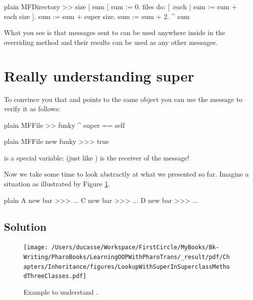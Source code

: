 \documentclass[10pt,twoside,english]{_support/latex/sbabook/sbabook}
\begin{document}
\begin{displaycode}{plain}
MFDirectory >> size
	| sum |
	sum := 0.
	files do: [ :each | sum := sum + each size ].
	sum := sum + super size.
	sum := sum + 2.
	^ sum
\end{displaycode}

What you see is that messages sent to  can be used anywhere inside in the overriding method and their results can be used as any other messages.
\section{Really understanding super}
To convince you that  and  points to the same object you can use the message \textcode{==} to verify it as follows: 

\begin{displaycode}{plain}
MFFile >> funky
	^ super == self
\end{displaycode}

\begin{displaycode}{plain}
MFFile new funky
>>> true
\end{displaycode}

\begin{important}
 is a special variable:  (just like ) is the receiver of the message! 
\end{important}

Now we take some time to look abstractly at what we presented so far. 
Imagine a situation as illustrated by Figure \ref{fig:LookupWithSuperInSuperclassMethodThreeClasses}.

\begin{displaycode}{plain}
A new bar
>>> ...
C new bar
>>> ...
D new bar
>>> ...
\end{displaycode}
\subsection{Solution }

\begin{figure}

\begin{center}
\texttt{[image: /Users/ducasse/Workspace/FirstCircle/MyBooks/Bk-Writing/PharoBooks/LearningOOPWithPharoTrans/\_result/pdf/Chapters/Inheritance/figures/LookupWithSuperInSuperclassMethodThreeClasses.pdf]}\caption{Example to understand .\label{fig:LookupWithSuperInSuperclassMethodThreeClasses}}\end{center}
\end{figure}
\end{document}
